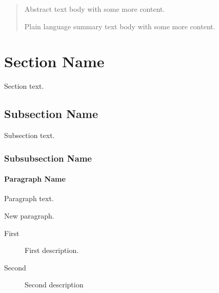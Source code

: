 \documentclass[published]{agujournal2025_4.22.25}
\begin{document}
\begin{abstract}
    Abstract text body with some more content.
     \begin{plainlanguagesummary}
            Plain language summary text body with some more content.
     \end{plainlanguagesummary}
\end{abstract}


\section{Section Name}  %

Section text.


\subsection{Subsection Name}

Subsection text.


\subsubsection{Subsubsection Name}


\paragraph{Paragraph Name}
Paragraph text.
%

New paragraph.
%
\begin{description}
    \item[First] First description.
    \item[Second] Second description
\end{description}
\end{document}
